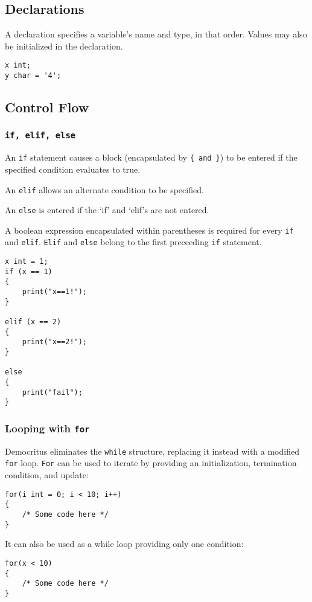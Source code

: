     \subsection{Declarations}
        A declaration specifies a variable's name and type, in that order. Values may also be initialized in the declaration.

        \begin{lstlisting}
x int;
y char = '4';
        \end{lstlisting}

    \subsection{Control Flow}

        \subsubsection{\texttt{if, elif, else}}
            An \texttt{if} statement causes a block (encapsulated by \verb|{ and }|) to be entered if the specified condition evaluates to true.

            \vspace{5mm}
            \noindent An \texttt{elif} allows an alternate condition to be specified.
            
            \vspace{5mm}
            \noindent An \texttt{else} is entered if the `if' and `elif's are not entered. 
           
           \vspace{5mm}
            \noindent A boolean expression encapsulated within parentheses is required for every \texttt{if} and \texttt{elif}. \texttt{Elif} and \texttt{else} belong to the first preceeding \texttt{if} statement. 


            \begin{lstlisting}
x int = 1;
if (x == 1)
{
    print("x==1!");
}

elif (x == 2)
{
    print("x==2!");
}

else 
{
    print("fail");
}
            \end{lstlisting}

        \subsubsection{Looping with \texttt{for}}
            Democritus eliminates the \texttt{while} structure, replacing it instead with a modified \texttt{for} loop. \texttt{For} can be used to iterate by providing an initialization, termination condition, and update:
            \begin{lstlisting}
for(i int = 0; i < 10; i++)
{
    /* Some code here */
}
            \end{lstlisting}

            It can also be used as a while loop providing only one condition:

            \begin{lstlisting}
for(x < 10)
{
    /* Some code here */
}
            \end{lstlisting}


